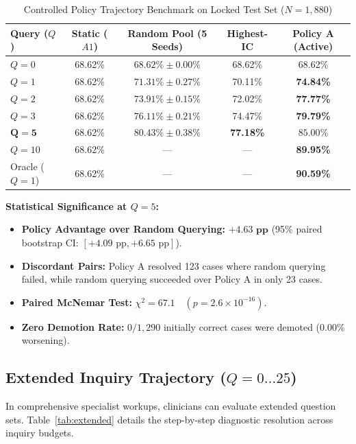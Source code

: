 \documentclass[conference]{IEEEtran}
\begin{document}
\begin{table}[htbp]
\caption{Controlled Policy Trajectory Benchmark on Locked Test Set ($N=1,880$)}
\begin{center}
\begin{tabular}{lcccc}
\toprule
\textbf{Query ($Q$)} & \textbf{Static ($A1$)} & \textbf{Random Pool (5 Seeds)} & \textbf{Highest-IC} & \textbf{Policy A (Active)} \\
\midrule
$Q = 0$ & 68.62\% & $68.62\% \pm 0.00\%$ & 68.62\% & 68.62\% \\
$Q = 1$ & 68.62\% & $71.31\% \pm 0.27\%$ & 70.11\% & \textbf{74.84\%} \\
$Q = 2$ & 68.62\% & $73.91\% \pm 0.15\%$ & 72.02\% & \textbf{77.77\%} \\
$Q = 3$ & 68.62\% & $76.11\% \pm 0.21\%$ & 74.47\% & \textbf{79.79\%} \\
$\mathbf{Q = 5}$ & 68.62\% & $\mathbf{80.43\% \pm 0.38\%}$ & \textbf{77.18\%} & $\mathbf{85.00\%}$ \\
$Q = 10$ & 68.62\% & --- & --- & \textbf{89.95\%} \\
\midrule
Oracle ($Q=1$) & 68.62\% & --- & --- & \textbf{90.59\%} \\
\bottomrule
\end{tabular}
\label{tab:controls}
\end{center}
\end{table}

\textbf{Statistical Significance at $Q=5$:}
\begin{itemize}
    \item \textbf{Policy Advantage over Random Querying:} $\mathbf{+4.63\text{ pp}}$ (95\% paired bootstrap CI: $[+4.09\text{ pp}, +6.65\text{ pp}]$).
    \item \textbf{Discordant Pairs:} Policy A resolved 123 cases where random querying failed, while random querying succeeded over Policy A in only 23 cases.
    \item \textbf{Paired McNemar Test:} $\chi^2 = 67.1 \quad (p = 2.6 \times 10^{-16})$.
    \item \textbf{Zero Demotion Rate:} $0 / 1,290$ initially correct cases were demoted ($0.00\%$ worsening).
\end{itemize}

\subsection{Extended Inquiry Trajectory ($Q = 0 \dots 25$)}
In comprehensive specialist workups, clinicians can evaluate extended question sets. Table~\ref{tab:extended} details the step-by-step diagnostic resolution across inquiry budgets.
\end{document}
